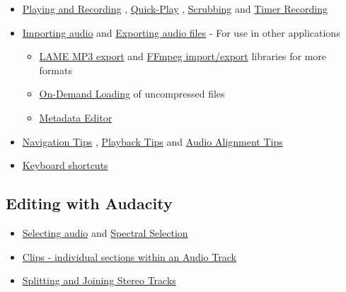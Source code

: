 \begin{multicols}{2}
\begin{itemize}
\begin{itemize}
\end{itemize}

\item 
\hyperref[\foo{man_playing_and_recording_}]{Playing and Recording}
, 
\hyperref[\foo{man_timeline_tqp}]{Quick-Play}
, 
\hyperref[\foo{man_scrubbing_and_seeking_}]{Scrubbing}
 and 
\hyperref[\foo{man_timer_record_}]{Timer Recording}

\item 
\hyperref[\foo{man_importing_audio_}]{Importing audio}
 and 
\hyperref[\foo{man_exporting_audio_}]{Exporting audio files}
 - For use in other applications

\begin{itemize}
\item 
\hyperref[\foo{man_faq_installation_and_plug_ins_lame}]{LAME MP3 export}
 and 
\hyperref[\foo{man_faq_installation_and_plug_ins_ffdown}]{FFmpeg import/export}
 libraries for more formats
\item 
\hyperref[\foo{man_on_demand_loading_}]{On-Demand Loading}
 of uncompressed files
\item 
\hyperref[\foo{man_metadata_editor_}]{Metadata Editor}

\end{itemize}

\item 
\hyperref[\foo{man_navigation_tips_}]{Navigation Tips}
, 
\hyperref[\foo{man_playback_tips_}]{Playback Tips}
 and 
\hyperref[\foo{man_audio_alignment_tips_}]{Audio Alignment Tips}

\item 
\hyperref[\foo{man_keyboard_shortcut_reference_}]{Keyboard shortcuts}

\end{itemize}

\subsection{Editing with Audacity}
\begin{itemize}
\item 
\hyperref[\foo{man_audacity_selection_}]{Selecting audio}
 and 
\hyperref[\foo{man_spectral_selection_}]{Spectral Selection}

\item 
\hyperref[\foo{man_audacity_tracks_and_clips_}]{Clips - individual sections within an Audio Track}

\item 
\hyperref[\foo{man_splitting_and_joining_stereo_tracks_}]{Splitting and Joining Stereo Tracks}


\end{itemize}
\end{multicols}
